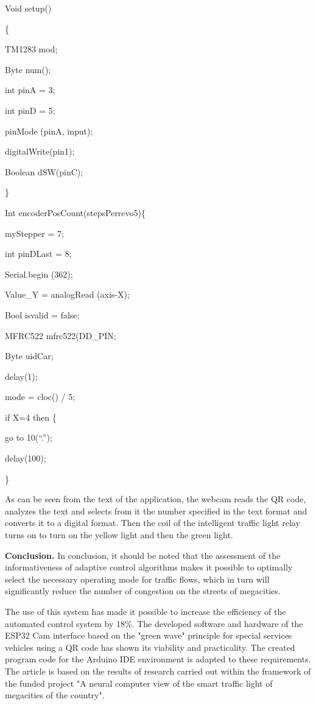 Void setup()

\{

TM1283 mod;

Byte num();

int pinA = 3;

int pinD = 5;

pinMode (pinA, input);

digitalWrite(pin1);

Boolean dSW(pinC);

\}

Int encoderPosCount(stepsPerrevo5)\{

myStepper = 7;

int pinDLast = 8;

Serial.begin (362);

Value\_Y = analogRead (axis-X);

Bool isvalid = false;

MFRC522 mfrc522(DD\_PIN;

Byte uidCar;

delay(1);

mode = cloc() / 5;

if X=4 then \{

go to 10(``.'');

delay(100);

\}

As can be seen from the text of the application, the webcam reads the QR
code, analyzes the text and selects from it the number specified in the
text format and converts it to a digital format. Then the coil of the
intelligent traffic light relay turns on to turn on the yellow light and
then the green light.

{\bfseries Conclusion.} In conclusion, it should be noted that the
assessment of the informativeness of adaptive control algorithms makes
it possible to optimally select the necessary operating mode for traffic
flows, which in turn will significantly reduce the number of congestion
on the streets of megacities.

The use of this system has made it possible to increase the efficiency
of the automated control system by 18\%. The developed software and
hardware of the ESP32 Cam interface based on the "green wave" principle
for special services vehicles using a QR code has shown its viability
and practicality. The created program code for the Arduino IDE
environment is adapted to these requirements. The article is based on
the results of research carried out within the framework of the funded
project "A neural computer view of the smart traffic light of megacities
of the country".

